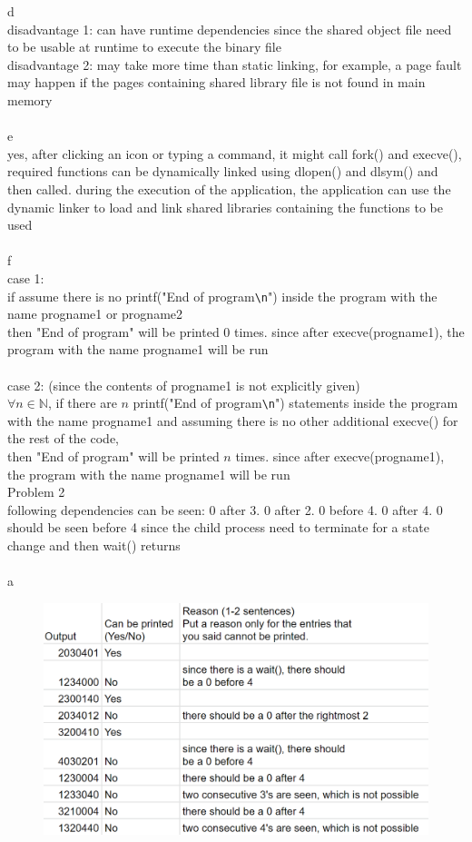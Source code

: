 \documentclass[12pt, border = 4pt, multi]{article} %
\begin{document}
d\\
disadvantage 1: can have runtime dependencies since the shared object file need to be usable at runtime to execute the binary file\\
disadvantage 2: may take more time than static linking, for example, a page fault may happen if the pages containing shared library file is not found in main memory\\
\\
e\\
yes, after clicking an icon or typing a command, it might call fork() and execve(), required functions can be dynamically linked using dlopen() and dlsym() and then called. during the execution of the application, the application can use the dynamic linker to load and link shared libraries containing the functions to be used\\
\\
f\\
case 1:\\
if assume there is no printf("End of program\verb|\n|") inside the program with the name progname1 or progname2\\
then "End of program" will be printed 0 times. since after execve(progname1), the program with the name progname1 will be run\\
\\
case 2: (since the contents of progname1 is not explicitly given)\\
$\forall n \in \mathbb{N}$, if there are $n$ printf("End of program\verb|\n|") statements inside the program with the name progname1 and assuming there is no other additional execve() for the rest of the code,\\
then "End of program" will be printed $n$ times. since after execve(progname1), the program with the name progname1 will be run\\
\newpage
\noindent
Problem 2\\
following dependencies can be seen: 0 after 3. 0 after 2. 0 before 4. 0 after 4. 0 should be seen before 4 since the child process need to terminate for a state change and then wait() returns\\
\\
a
\begin{figure}[h!]
	\centering
	\includegraphics[width = 1.1\textwidth, height = 0.7\textwidth]{2} %
\end{figure}\\
\end{document}
